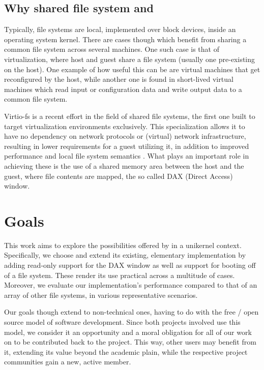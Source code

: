 \subsection{Why shared file system and \viofs{}}

Typically, file systems are local, implemented over block devices, inside an
operating system kernel. There are cases though which benefit from sharing a
common file system across several machines. One such case is that of
virtualization, where host and guest share a file system (usually one
pre-existing on the host). One example of how useful this can be are virtual
machines that get reconfigured by the host, while another one is found in
short-lived virtual machines which read input or configuration data and write
output data to a common file system.

Virtio-fs is a recent effort in the field of shared file systems, the first one
built to target virtualization environments exclusively. This specialization
allows it to have no dependency on network protocols or (virtual) network
infrastructure, resulting in lower requirements for a guest utilizing it, in
addition to improved performance and local file system semantics
\cite{virtiofs-website}. What plays an important role in achieving these
is the use of a shared memory area between the host and the guest, where file
contents are mapped, the so called DAX (Direct Access) window.

\section{Goals}

This work aims to explore the possibilities offered by \viofs{} in a unikernel
context. Specifically, we choose \osv{} and extend its existing, elementary
\viofs{} implementation by adding read-only support for the DAX window as well
as support for booting off of a \viofs{} file system. These render its use
practical across a multitude of cases. Moreover, we evaluate our
implementation's performance compared to that of an array of other file systems,
in various representative scenarios.

Our goals though extend to non-technical ones, having to do with the free / open
source model of software development. Since both projects involved use this
model, we consider it an opportunity and a moral obligation for all of our work
on \osv{} to be contributed back to the project. This way, other users may
benefit from it, extending its value beyond the academic plain, while the
respective project communities gain a new, active member.

